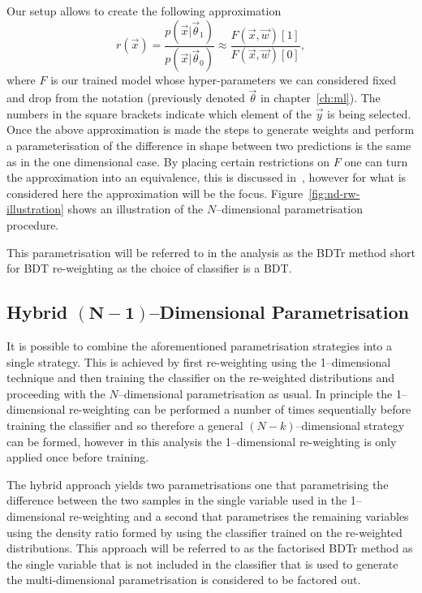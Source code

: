 Our setup allows to create the following approximation
\begin{equation}
  r(\vec{x}) =  \frac{p(\vec{x}|\vec{\theta}_{1})}{p(\vec{x}|\vec{\theta}_{0})}
  \approx \frac{F(\vec{x}, \vec{w})[1]}{F(\vec{x}, \vec{w})[0]},
  \label{eq:bdtr-approximation}
\end{equation}
where $F$ is our trained model whose hyper-parameters we can considered fixed
and drop from the notation (previously denoted $\vec{\theta}$ in
chapter~\ref{ch:ml}). The numbers in the square brackets indicate which element
of the $\vec{y}$ is being selected. Once the above approximation is made the
steps to generate weights and perform a parameterisation of the difference in
shape between two predictions is the same as in the one dimensional case. By
placing certain restrictions on $F$ one can turn the approximation into an
equivalence, this is discussed in~\cite{VHModellingNote2019}, however for what
is considered here the approximation will be the focus.
Figure~\ref{fig:nd-rw-illustration} shows an illustration of the
$N$--dimensional parametrisation procedure.

This parametrisation will be referred to in the analysis as the BDTr method
short for BDT re-weighting as the choice of classifier is a BDT.

\subsection{Hybrid $\mathbf{(N - 1)}$--Dimensional Parametrisation}
\label{sec:hybrid-reweight}

It is possible to combine the aforementioned parametrisation strategies into a
single strategy. This is achieved by first re-weighting using the 1--dimensional
technique and then training the classifier on the re-weighted distributions and
proceeding with the $N$--dimensional parametrisation as usual. In principle the
1--dimensional re-weighting can be performed a number of times sequentially
before training the classifier and so therefore a general $(N-k)$--dimensional
strategy can be formed, however in this analysis the 1--dimensional re-weighting
is only applied once before training.

The hybrid approach yields two parametrisations one that parametrising the
difference between the two samples in the single variable used in the
1--dimensional re-weighting and a second that parametrises the remaining
variables using the density ratio formed by using the classifier trained on the
re-weighted distributions. This approach will be referred to as the factorised
BDTr method as the single variable that is not included in the classifier that
is used to generate the multi-dimensional parametrisation is considered to be
factored out.

